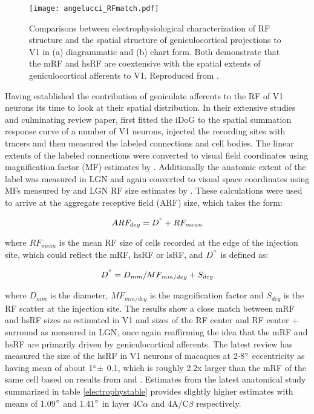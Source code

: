\begin{figure}
	\centering
        \texttt{[image: angelucci\_RFmatch.pdf]}
	\caption[Comparison between anatomical and electrophysiological
      estimates of V1 receptive field extents. Reproduced from
      \cite{Angelucci2006}.]{Comparisons between electrophysiological
      characterization of RF structure and the spatial structure of
      geniculocortical projections to V1 in (a) diagrammatic and (b)
      chart form. Both demonstrate that the mRF and hsRF are
      coextensive with the spatial extents of geniculocortical
      afferents to V1. Reproduced from \cite{Angelucci2006}.}
	\label{FFmatch}
\end{figure}

Having established the contribution of geniculate afferents to the RF
of V1 neurons its time to look at their spatial distribution. In their
extensive studies and culminating review paper, \cite{Angelucci2006}
first fitted the iDoG to the spatial summation response curve of a
number of V1 neurons, injected the recording sites with tracers and
then measured the labeled connections and cell bodies. The linear
extents of the labeled connections were converted to visual field
coordinates using magnification factor (MF) estimates by
\cite{VanEssen1984}. Additionally the anatomic extent of the label was
measured in LGN and again converted to visual space coordinates using
MFs measured by \cite{Connolly1984} and LGN RF size estimates by
\cite{Derrington1984}. These calculations were used to arrive at the
aggregate receptive field (ARF) size, which takes the form:

\begin{equation}
  ARF_{deg} = D^{\degree} + RF_{mean}
\end{equation}

where $RF_{mean}$ is the mean RF size of cells recorded at the edge of
the injection site, which could reflect the mRF, hsRF or lsRF, and
$D^{\degree}$ is defined as:

\begin{equation}
  D^{\degree} = D_{mm} / MF_{mm/deg} + S_{deg}
\end{equation}

where $D_{mm}$ is the diameter, $MF_{mm/deg}$ is the magnification
factor and $S_{deg}$ is the RF scatter at the injection site. The
results show a close match between mRF and hsRF sizes as estimated in
V1 and sizes of the RF center and RF center + surround as measured in
LGN, once again reaffirming the idea that the mRF and hsRF are
primarily driven by geniculocortical afferents. The latest review
\citep{Angelucci2006} has measured the size of the hsRF in V1 neurons
of macaques at 2-8$\degree$ eccentricity as having mean of about
1$\degree \pm$ 0.1, which is roughly 2.2x larger than the mRF of the
same cell based on results from \cite{Angelucci2002} and
\cite{Levitt2002}. Estimates from the latest anatomical study
summarized in table \ref{electrophystable} provides slightly higher
estimates with means of 1.09$\degree$ and 1.41$\degree$ in layer
4C$\alpha$ and 4A/C$\beta$ respectively.

